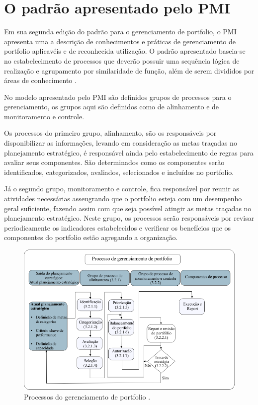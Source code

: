 \documentclass[12pt,a4paper,ruledheader,tocpage=prefix,floatnumber=continuous,pagestart=folhaderosto,font=times]{abnt}
\begin{document}
\section{O padrão apresentado pelo PMI}
Em sua segunda edição do padrão para o gerenciamento de portfolio, o PMI apresenta uma a descrição de conhecimentos e práticas de gerenciamento de 
portfolio aplicavéis e de reconhecida utilização. O padrão apresentado baseia-se no estabelecimento de processos que deverão possuir uma sequência lógica 
de realização e agrupamento por similaridade de função, além de serem divididos por áreas de conhecimento \cite{SPPM2008}.

No modelo apresentado pelo PMI são definidos grupos de processos para o gerenciamento, os grupos aqui são definidos como de alinhamento e de monitoramento
e controle. 

Os processos do primeiro grupo, alinhamento, são os responsáveis por disponibilizar as informações, levando em consideração as metas traçadas 
no planejamento estratégico, é responsável ainda pelo estabelecimento de regras para avaliar seus componentes. São determinados como os componentes serão 
identificados, categorizados, avaliados, selecionados e incluídos no portfolio.

Já o segundo grupo, monitoramento e controle, fica responsável por reunir as atividades necessárias asseugrando que o portfolio esteja com um desempenho 
geral suficiente, fazendo assim com que seja possível atingir as metas traçadas no planejamento estratégico. Neste grupo, os processos serão responsáveis
por revisar periodicamente os indicadores estabelecidos e verificar os benefícios que os componentes do portfolio estão agregando a organização.

\begin{figure}[H]
\centering
\includegraphics[width=.9\textwidth]{img/fig11.png}
\caption{Processos do gerenciamento de portfolio \cite{SPPM2008}.}
\end{figure}
\end{document}
